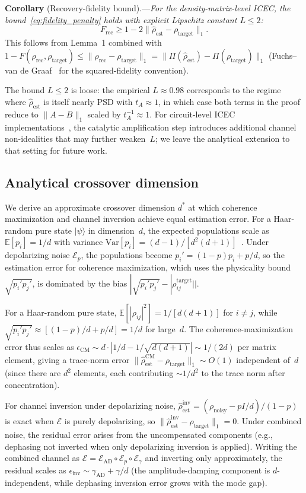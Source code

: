 \documentclass[prx,twocolumn,superscriptaddress,longbibliography,floatfix]{revtex4-2}
\newcommand{\EE}{\mathcal{E}}
\newcommand{\Frec}{F_\mathrm{rec}}
\newcommand{\rhot}{\rho_\mathrm{target}}
\newcommand{\rhon}{\rho_\mathrm{noisy}}
\newcommand{\rhor}{\rho_\mathrm{rec}}
\newcommand{\rhoe}{\hat{\rho}_\mathrm{est}}
\begin{document}
\noindent\textbf{Corollary} (Recovery-fidelity bound).---\textit{For the density-matrix-level ICEC, the bound~\eqref{eq:fidelity_penalty} holds with explicit Lipschitz constant $L \leq 2$:
\begin{equation}
\Frec \geq 1 - 2\|\rhoe - \rhot\|_1.
\label{eq:explicit_bound}
\end{equation}
}
This follows from Lemma~1 combined with $1 - F(\rhor, \rhot) \leq \|\rhor - \rhot\|_1 = \|\Pi(\rhoe) - \Pi(\rhot)\|_1$ (Fuchs--van de Graaf~\cite{FuchsGraaf1999} for the squared-fidelity convention).

The bound $L \leq 2$ is loose: the empirical $L \approx 0.98$ corresponds to the regime where $\rhoe$ is itself nearly PSD with $t_A \approx 1$, in which case both terms in the proof reduce to $\|A - B\|_1$ scaled by $t_A^{-1} \approx 1$.
For circuit-level ICEC implementations~\cite{Wakaura2026unified}, the catalytic amplification step introduces additional channel non-idealities that may further weaken~$L$; we leave the analytical extension to that setting for future work.


\subsection{Analytical crossover dimension}
\label{sec:crossover_theory}

We derive an approximate crossover dimension $d^*$ at which coherence maximization and channel inversion achieve equal estimation error.
For a Haar-random pure state $|\psi\rangle$ in dimension~$d$, the expected populations scale as $\mathbb{E}[p_i] = 1/d$ with variance $\mathrm{Var}[p_i] = (d-1)/[d^2(d+1)]$~\cite{NielsenChuang2010}.
Under depolarizing noise $\EE_p$, the populations become $p_i' = (1-p)p_i + p/d$, so the estimation error for coherence maximization, which uses the physicality bound $\sqrt{p_i' p_j'}$, is dominated by the bias $|\sqrt{p_i' p_j'} - |\rho_{ij}^{\mathrm{target}}||$.

For a Haar-random pure state, $\mathbb{E}[|\rho_{ij}|^2] = 1/[d(d+1)]$ for $i \neq j$, while $\sqrt{p_i' p_j'} \approx [(1-p)/d + p/d] = 1/d$ for large~$d$.
The coherence-maximization error thus scales as $\epsilon_{\mathrm{CM}} \sim d \cdot |1/d - 1/\sqrt{d(d+1)}| \sim 1/(2d)$ per matrix element, giving a trace-norm error $\|\rhoe^{\mathrm{CM}} - \rhot\|_1 \sim O(1)$ independent of~$d$ (since there are $d^2$ elements, each contributing $\sim 1/d^2$ to the trace norm after concentration).

For channel inversion under depolarizing noise, $\rhoe^{\mathrm{inv}} = (\rhon - pI/d)/(1-p)$ is exact when $\EE$ is purely depolarizing, so $\|\rhoe^{\mathrm{inv}} - \rhot\|_1 = 0$.
Under combined noise, the residual error arises from the uncompensated components (e.g., dephasing not inverted when only depolarizing inversion is applied).
Writing the combined channel as $\EE = \EE_{\mathrm{AD}} \circ \EE_p \circ \EE_\gamma$ and inverting only approximately, the residual scales as $\epsilon_{\mathrm{inv}} \sim \gamma_{\mathrm{AD}} + \gamma/d$ (the amplitude-damping component is $d$-independent, while dephasing inversion error grows with the mode gap).
\end{document}

